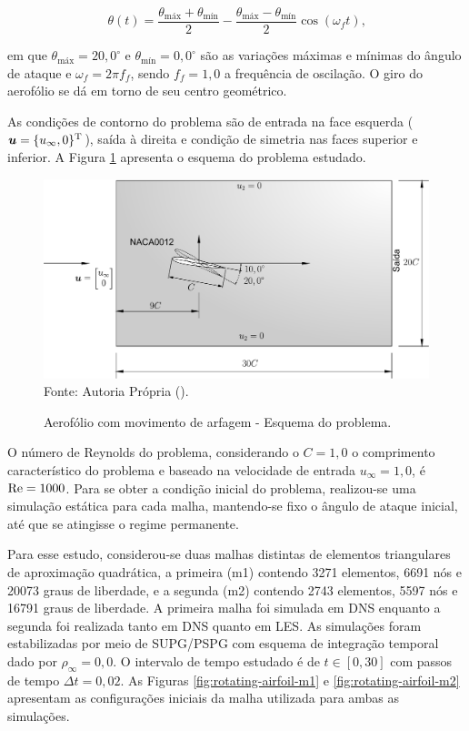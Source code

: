 \begin{equation}
    \theta(t)=\frac{\theta_\mathrm{máx}+\theta_\mathrm{mín}}{2}-\frac{\theta_\mathrm{máx}-\theta_\mathrm{mín}}{2}\cos{(\omega_f t)}\text{,}
\end{equation}

\noindent em que $\theta_\mathrm{máx}=20,0^\circ$ e $\theta_\mathrm{mín}=0,0^\circ$ são as variações máximas e mínimas do ângulo de ataque e $\omega_f=2\pi f_f$, sendo $f_f=1,0$ a frequência de oscilação. O giro do aerofólio se dá em torno de seu centro geométrico.

As condições de contorno do problema são de entrada na face esquerda ($\boldsymbol{u}=\{u_\infty,0\}^\mathrm{T}$), saída à direita e condição de simetria nas faces superior e inferior. A Figura \ref{fig:rotating-airfoil} apresenta o esquema do problema estudado.

\begin{figure}[h!]
    \centering
    \caption{Aerofólio com movimento de arfagem - Esquema do problema.}
    \includegraphics[width=.8\linewidth]{Figuras/rotating-airfoil/rotating-airfoil.pdf}
    \\Fonte: Autoria Própria (\the\year).
    \label{fig:rotating-airfoil}
\end{figure}

O número de Reynolds do problema, considerando o $C=1,0$ o comprimento característico do problema e baseado na velocidade de entrada $u_\infty=1,0$, é $\mathrm{Re}=1000$. Para se obter a condição inicial do problema, realizou-se uma simulação estática para cada malha, mantendo-se fixo o ângulo de ataque inicial, até que se atingisse o regime permanente.

Para esse estudo, considerou-se duas malhas distintas de elementos triangulares de aproximação quadrática, a primeira (m1) contendo 3271 elementos, 6691 nós e 20073 graus de liberdade, e a segunda (m2) contendo 2743 elementos, 5597 nós e 16791 graus de liberdade. A primeira malha foi simulada em DNS enquanto a segunda foi realizada tanto em DNS quanto em LES. As simulações foram estabilizadas por meio de SUPG/PSPG com esquema de integração temporal dado por $\rho_\infty=0,0$. O intervalo de tempo estudado é de $t\in[0,30]$ com passos de tempo $\Delta t=0,02$. As Figuras \ref{fig:rotating-airfoil-m1} e \ref{fig:rotating-airfoil-m2} apresentam as configurações iniciais da malha utilizada para ambas as simulações.

